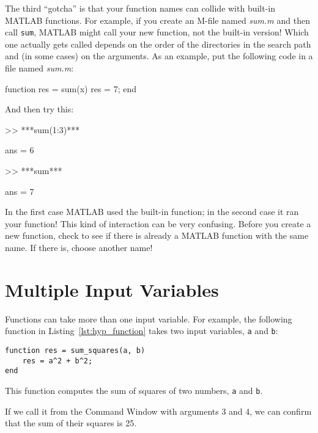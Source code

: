The third ``gotcha'' is that your function names can collide with built-in
MATLAB functions.  For example, if you create an M-file named \emph{sum.m} and then call \lstinline{sum}, MATLAB might call your new
function, not the built-in version!  Which one actually gets called
depends on the order of the directories in the search path and
(in some cases) on the arguments.  As an example, put the following
code in a file named \emph{sum.m}:


\begin{code}
function res = sum(x)
   res = 7;
end
\end{code}

And then try this:

\begin{code}
>> ***sum(1:3)***

ans = 6

>> ***sum***

ans = 7
\end{code}

In the first case MATLAB used the built-in function; in the second
case it ran your function!  This kind of interaction can be very
confusing.  Before you create a new function, check to see if there is
already a MATLAB function with the same name.  If there is, choose
another name!

\section{Multiple Input Variables}
\label{hypotenuse}


Functions can take more than one input variable.
For example, the following function in Listing~\ref{lst:hyp_function} takes two input variables,
\lstinline{a} and \lstinline{b}:

\begin{lstlisting}[caption={A function that computes the sum of squares of two numbers}, label={lst:hyp_function}]
function res = sum_squares(a, b)
    res = a^2 + b^2;
end
\end{lstlisting}
  
This function computes the sum of squares of two numbers, \lstinline{a}
and \lstinline{b}.

If we call it from the Command Window with arguments 3 and 4, we can
confirm that the sum of their squares is 25.


